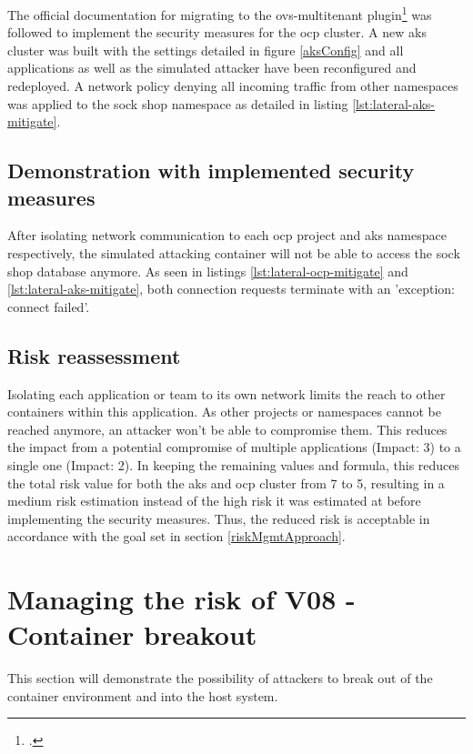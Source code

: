 The official documentation for migrating to the ovs-multitenant plugin\footcite{networkPluginSwitch} was followed to implement the security measures for the \gls{ocp} cluster. A new \gls{aks} cluster was built with the settings detailed in figure \ref{aksConfig} and all applications as well as the simulated attacker have been reconfigured and redeployed. A network policy denying all incoming traffic from other namespaces was applied to the sock shop namespace as detailed in listing \ref{lst:lateral-aks-mitigate}.

\subsection{Demonstration with implemented security measures}

After isolating network communication to each \gls{ocp} project and \gls{aks} namespace respectively, the simulated attacking container will not be able to access the sock shop database anymore. As seen  in listings \ref{lst:lateral-ocp-mitigate} and \ref{lst:lateral-aks-mitigate}, both connection requests terminate with an 'exception: connect failed'.

\subsection{Risk reassessment}

Isolating each application or team to its own network limits the reach to other containers within this application. As other projects or namespaces cannot be reached anymore, an attacker won't be able to compromise them. This reduces the impact from a potential compromise of multiple applications (Impact: 3) to a single one (Impact: 2).
In keeping the remaining values and formula, this reduces the total risk value for both the \gls{aks} and \gls{ocp} cluster from 7 to 5, resulting in a medium risk estimation instead of the high risk it was estimated at before implementing the security measures. Thus, the reduced risk is acceptable in accordance with the goal set in section \ref{riskMgmtApproach}.

\section{Managing the risk of V08 - Container breakout}

This section will demonstrate the possibility of attackers to break out of the container environment and into the host system.

